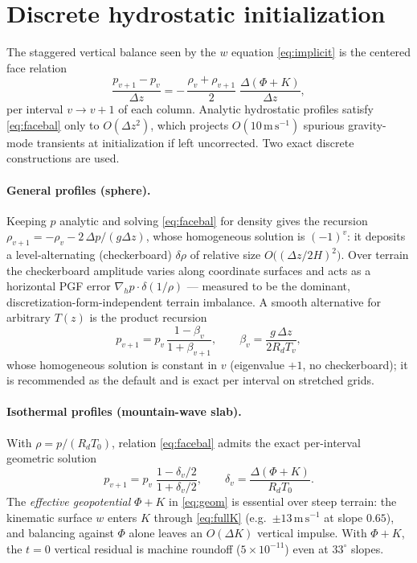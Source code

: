 \documentclass[11pt]{article}
\newcommand{\Rd}{R_d}
\begin{document}
\section{Discrete hydrostatic initialization}
\label{sec:hydro}

The staggered vertical balance seen by the $w$ equation
\eqref{eq:implicit} is the centered face relation
\begin{equation}
\frac{p_{v+1} - p_v}{\Delta z}
= -\,\frac{\rho_v + \rho_{v+1}}{2}\;
  \frac{\Delta(\Phi + K)}{\Delta z},
\label{eq:facebal}
\end{equation}
per interval $v \to v{+}1$ of each column. Analytic hydrostatic profiles
satisfy \eqref{eq:facebal} only to $O(\Delta z^2)$, which projects
$O(10\,\mathrm{m\,s^{-1}})$ spurious gravity-mode transients at
initialization if left uncorrected. Two exact discrete constructions are
used.

\paragraph{General profiles (sphere).}
Keeping $p$ analytic and solving \eqref{eq:facebal} for density gives the
recursion $\rho_{v+1} = -\rho_v - 2\,\Delta p/(g \Delta z)$, whose
homogeneous solution is $(-1)^v$: it deposits a level-alternating
(checkerboard) $\delta\rho$ of relative size $O\big((\Delta z/2H)^2\big)$.
Over terrain the checkerboard amplitude varies along coordinate surfaces
and acts as a horizontal PGF error $\nabla_h p \cdot \delta(1/\rho)$ ---
measured to be the dominant, discretization-form-independent terrain
imbalance. A smooth alternative for arbitrary $T(z)$ is the product
recursion
\begin{equation}
p_{v+1} = p_v\,\frac{1 - \beta_v}{1 + \beta_{v+1}},
\qquad
\beta_v = \frac{g\,\Delta z}{2 \Rd T_v},
\end{equation}
whose homogeneous solution is constant in $v$ (eigenvalue $+1$, no
checkerboard); it is recommended as the default and is exact per
interval on stretched grids.

\paragraph{Isothermal profiles (mountain-wave slab).}
With $\rho = p/(\Rd T_0)$, relation \eqref{eq:facebal} admits the exact
per-interval geometric solution
\begin{equation}
p_{v+1} = p_v\;\frac{1 - \delta_v/2}{1 + \delta_v/2},
\qquad
\delta_v = \frac{\Delta(\Phi + K)}{\Rd T_0}.
\label{eq:geom}
\end{equation}
The \emph{effective geopotential} $\Phi + K$ in \eqref{eq:geom} is
essential over steep terrain: the kinematic surface $w$ enters $K$
through \eqref{eq:fullK} (e.g.\ $\pm 13\,\mathrm{m\,s^{-1}}$ at slope
$0.65$), and balancing against $\Phi$ alone leaves an $O(\Delta K)$
vertical impulse. With $\Phi + K$, the $t=0$ vertical residual is machine
roundoff ($5\times10^{-11}$) even at $33^\circ$ slopes.
\end{document}
